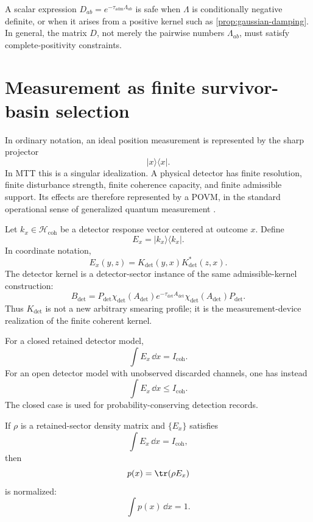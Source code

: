 \documentclass[11pt]{article}
\newcommand{\ta}{\tau_{\mathrm{adm}}}
\newcommand{\Hcoh}{\mathcal H_{\mathrm{coh}}}
\newcommand{\coh}{\mathrm{coh}}
\begin{document}
\begin{remark}
A scalar expression \(D_{ab}=e^{-\ta\Lambda_{ab}}\) is safe when \(\Lambda\) is conditionally
negative definite, or when it arises from a positive kernel such as \cref{prop:gaussian-damping}.
In general, the matrix \(D\), not merely the pairwise numbers \(\Lambda_{ab}\), must satisfy
complete-positivity constraints.
\end{remark}

\section{Measurement as finite survivor-basin selection}

In ordinary notation, an ideal position measurement is represented by the sharp projector
\[
  |x\rangle\langle x|.
\]
In MTT this is a singular idealization. A physical detector has finite resolution, finite
disturbance strength, finite coherence capacity, and finite admissible support. Its effects are
therefore represented by a POVM, in the standard operational sense of generalized quantum
measurement \cite{NielsenChuang}.

\begin{definition}
Let \(k_x\in\Hcoh\) be a detector response vector centered at outcome \(x\). Define
\[
  E_x=|k_x\rangle\langle k_x|.
\]
In coordinate notation,
\[
  E_x(y,z)=K_{\det}(y,x)K_{\det}^\ast(z,x).
\]
The detector kernel is a detector-sector instance of the same admissible-kernel construction:
\[
  B_{\det}
  =
  P_{\det}\chi_{\det}(A_{\det})
  e^{-\tau_{\det}A_{\det}}
  \chi_{\det}(A_{\det})P_{\det}.
\]
Thus \(K_{\det}\) is not a new arbitrary smearing profile; it is the measurement-device
realization of the finite coherent kernel.
\end{definition}

\begin{assumption}
For a closed retained detector model,
\[
  \int E_x\,\dd x=I_{\coh}.
  \label{eq:povm-normalization}
\]
For an open detector model with unobserved discarded channels, one has instead
\[
  \int E_x\,\dd x\le I_{\coh}.
\]
The closed case is used for probability-conserving detection records.
\end{assumption}

\begin{proposition}
If \(\rho\) is a retained-sector density matrix and \(\{E_x\}\) satisfies
\[
  \int E_x\,\dd x=I_{\coh},
\]
then
\[
  p(x)=\tr(\rho E_x)
\]
is normalized:
\[
  \int p(x)\,\dd x=1.
\]
\end{proposition}
\end{document}
